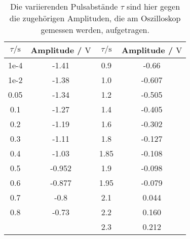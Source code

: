 \begin{table} \caption{Die variierenden Pulsabstände $\tau$ sind hier gegen die zugehörigen Amplituden, die am Oszilloskop gemessen werden, aufgetragen.}
    \label{tab:t1}
    \centering
    \begin{tabular}{S[] S[] | S[] S[]}
        \toprule
        {$\tau / \si{\second}$} & {Amplitude / $\si{\volt}$} & {$\tau / \si{\second}$} & {Amplitude / $\si{\volt}$} \\
        \midrule
        1e-4&  -1.41    &        0.9  &  -0.66    \\
        1e-2&  -1.38    &        1.0  &  -0.607   \\
        0.05&  -1.34    &        1.2  &  -0.505   \\
        0.1 &  -1.27    &        1.4  &  -0.405   \\
        0.2 &  -1.19    &        1.6  &  -0.302   \\
        0.3 &  -1.11    &        1.8  &  -0.127   \\
        0.4 &  -1.03    &        1.85 &  -0.108   \\
        0.5 &  -0.952   &        1.9  &  -0.098   \\
        0.6 &  -0.877   &        1.95 &  -0.079   \\
        0.7 &  -0.8     &        2.1  &   0.044   \\
        0.8 &  -0.73    &        2.2  &   0.160 \\
            &           &        2.3  &  0.212  \\
        \bottomrule
    \end{tabular}
\end{table}